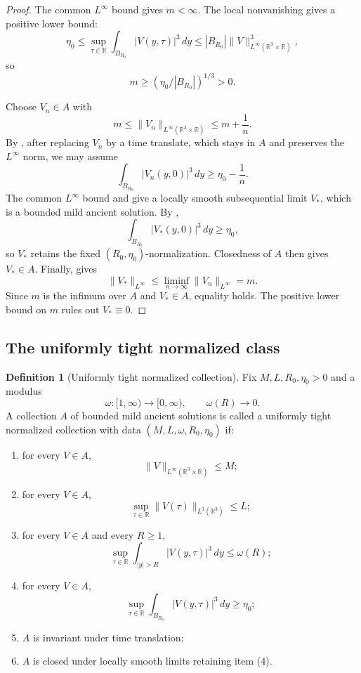 \documentclass[11pt]{amsart}
\theoremstyle{plain}
\theoremstyle{definition}
\newtheorem{definition}[definition]{Definition}
\theoremstyle{remark}
\numberwithin{equation}{section}
\newcommand{\R}{\mathbb R}
\begin{document}
\begin{proof}
The common \(L^\infty\) bound gives \(m<\infty\).  The local nonvanishing gives
a positive lower bound:
\[
   \eta_0
   \le
   \sup_{\tau\in\R}\int_{B_{R_0}}|V(y,\tau)|^3\,dy
   \le
   |B_{R_0}|\|V\|_{L^\infty(\R^3\times\R)}^3,
\]
so
\[
   m\ge \left(\eta_0/|B_{R_0}|\right)^{1/3}>0.
\]

Choose \(V_n\in A\) with
\[
   m\le \|V_n\|_{L^\infty(\R^3\times\R)}\le m+\frac1n .
\]
By , after replacing \(V_n\) by a time translate,
which stays in \(A\) and preserves the \(L^\infty\) norm, we may assume
\[
   \int_{B_{R_0}}|V_n(y,0)|^3\,dy\ge \eta_0-\frac1n .
\]
The common \(L^\infty\) bound and  give a
locally smooth subsequential limit \(V_*\), which is a bounded mild ancient
solution.  By ,
\[
   \int_{B_{R_0}}|V_*(y,0)|^3\,dy\ge\eta_0,
\]
so \(V_*\) retains the fixed \((R_0,\eta_0)\)-normalization.  Closedness of
\(A\) then gives \(V_*\in A\).  Finally,  gives
\[
   \|V_*\|_{L^\infty}
   \le
   \liminf_{n\to\infty}\|V_n\|_{L^\infty}
   =m.
\]
Since \(m\) is the infimum over \(A\) and \(V_*\in A\), equality holds.  The
positive lower bound on \(m\) rules out \(V_*\equiv0\).
\end{proof}

\subsection{The uniformly tight normalized class}

\begin{definition}[Uniformly tight normalized collection]
\label{p2:def:tight-normalized-collection}
Fix \(M,L,R_0,\eta_0>0\) and a modulus
\[
   \omega:[1,\infty)\to[0,\infty),
   \qquad \omega(R)\to0.
\]
A collection \(A\) of bounded mild ancient solutions is called a uniformly
tight normalized collection with data \((M,L,\omega,R_0,\eta_0)\) if:
\begin{enumerate}[label=\textup{(\arabic*)}]
\item for every \(V\in A\),
\[
   \|V\|_{L^\infty(\R^3\times\R)}\le M;
\]
\item for every \(V\in A\),
\[
   \sup_{\tau\in\R}\|V(\tau)\|_{L^3(\R^3)}\le L;
\]
\item for every \(V\in A\) and every \(R\ge1\),
\[
   \sup_{\tau\in\R}
   \int_{|y|>R}|V(y,\tau)|^3\,dy\le \omega(R);
\]
\item for every \(V\in A\),
\[
   \sup_{\tau\in\R}
   \int_{B_{R_0}}|V(y,\tau)|^3\,dy\ge\eta_0;
\]
\item \(A\) is invariant under time translation;
\item \(A\) is closed under locally smooth limits retaining item \textup{(4)}.
\end{enumerate}
\end{definition}
\end{document}
